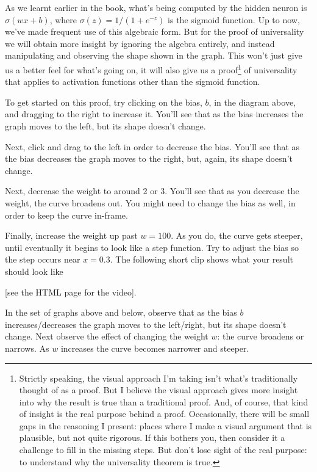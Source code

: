 As we learnt earlier in the book, what's being computed by the hidden neuron is $\sigma (wx+b)$, where $\sigma(z)=1/(1+e^{-z})$ is the sigmoid function. Up to now, we've made frequent use of this algebraic form. But for the proof of universality we will obtain more insight by ignoring the algebra entirely, and instead manipulating and observing the shape shown in the graph. This won't just give us a better feel for what's going on, it will also give us a proof\footnote{Strictly speaking, the visual approach I'm taking isn't what's traditionally thought of as a proof. But I believe the visual approach gives more insight into why the result is true than a traditional proof. And, of course, that kind of insight is the real purpose behind a proof. Occasionally, there will be small gaps in the reasoning I present: places where I make a visual argument that is plausible, but not quite rigorous. If this bothers you, then consider it a challenge to fill in the missing steps. But don't lose sight of the real purpose: to understand why the universality theorem is true.} of universality that applies to activation functions other than the sigmoid function.

To get started on this proof, try clicking on the bias, $b$, in the diagram above, and dragging to the right to increase it. You'll see that as the bias increases the graph moves to the left, but its shape doesn't change.

Next, click and drag to the left in order to decrease the bias. You'll see that as the bias decreases the graph moves to the right, but, again, its shape doesn't change.

Next, decrease the weight to around 2 or 3. You'll see that as you decrease the weight, the curve broadens out. You might need to change the bias as well, in order to keep the curve in-frame.

Finally, increase the weight up past $w=100$. As you do, the curve gets steeper, until eventually it begins to look like a step function. Try to adjust the bias so the step occurs near $x=0.3$. The following short clip shows what your result should look like 

[see the HTML page for the video].



In the set of graphs above and below, observe  that as the bias $b$ increases/decreases the graph moves to the left/right, but its shape doesn't change.
Next observe the effect of changing the weight $w$: the curve broadens or narrows. As $w$ increases the curve becomes narrower and steeper.

